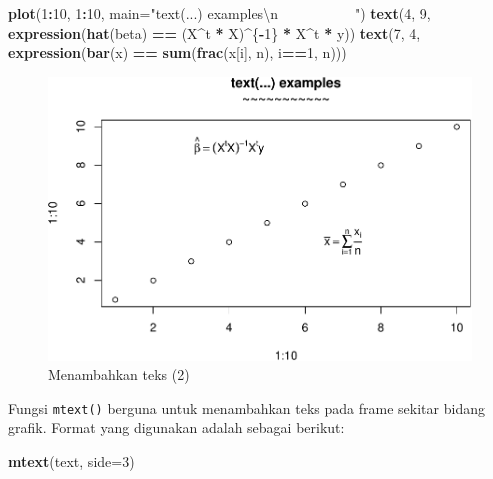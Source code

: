 \documentclass[]{book}
\newenvironment{Shaded}{\begin{snugshade}}{\end{snugshade}}
\newcommand{\KeywordTok}[1]{\textcolor[rgb]{0.13,0.29,0.53}{\textbf{#1}}}
\newcommand{\DataTypeTok}[1]{\textcolor[rgb]{0.13,0.29,0.53}{#1}}
\newcommand{\DecValTok}[1]{\textcolor[rgb]{0.00,0.00,0.81}{#1}}
\newcommand{\CharTok}[1]{\textcolor[rgb]{0.31,0.60,0.02}{#1}}
\newcommand{\StringTok}[1]{\textcolor[rgb]{0.31,0.60,0.02}{#1}}
\newcommand{\OperatorTok}[1]{\textcolor[rgb]{0.81,0.36,0.00}{\textbf{#1}}}
\newcommand{\NormalTok}[1]{#1}
\begin{document}
\begin{Shaded}
\begin{Highlighting}[]
\KeywordTok{plot}\NormalTok{(}\DecValTok{1}\OperatorTok{:}\DecValTok{10}\NormalTok{, }\DecValTok{1}\OperatorTok{:}\DecValTok{10}\NormalTok{, }
     \DataTypeTok{main=}\StringTok{"text(...) examples}\CharTok{\textbackslash{}n}\StringTok{~~~~~~~~~~~"}\NormalTok{)}
\KeywordTok{text}\NormalTok{(}\DecValTok{4}\NormalTok{, }\DecValTok{9}\NormalTok{, }\KeywordTok{expression}\NormalTok{(}\KeywordTok{hat}\NormalTok{(beta) }\OperatorTok{==}\StringTok{ }\NormalTok{(X}\OperatorTok{^}\NormalTok{t }\OperatorTok{*}\StringTok{ }\NormalTok{X)}\OperatorTok{^}\NormalTok{\{}\OperatorTok{-}\DecValTok{1}\NormalTok{\} }\OperatorTok{*}\StringTok{ }\NormalTok{X}\OperatorTok{^}\NormalTok{t }\OperatorTok{*}\StringTok{ }\NormalTok{y))}
\KeywordTok{text}\NormalTok{(}\DecValTok{7}\NormalTok{, }\DecValTok{4}\NormalTok{, }\KeywordTok{expression}\NormalTok{(}\KeywordTok{bar}\NormalTok{(x) }\OperatorTok{==}\StringTok{ }\KeywordTok{sum}\NormalTok{(}\KeywordTok{frac}\NormalTok{(x[i], n), i}\OperatorTok{==}\DecValTok{1}\NormalTok{, n)))}
\end{Highlighting}
\end{Shaded}

\begin{figure}

{\centering \includegraphics[width=0.7\linewidth]{EnvStat_files/figure-latex/text2-1} 

}

\caption{Menambahkan teks (2)}\label{fig:text2}
\end{figure}

Fungsi \texttt{mtext()} berguna untuk menambahkan teks pada frame
sekitar bidang grafik. Format yang digunakan adalah sebagai berikut:

\begin{Shaded}
\begin{Highlighting}[]
\KeywordTok{mtext}\NormalTok{(text, }\DataTypeTok{side=}\DecValTok{3}\NormalTok{)}
\end{Highlighting}
\end{Shaded}
\end{document}

